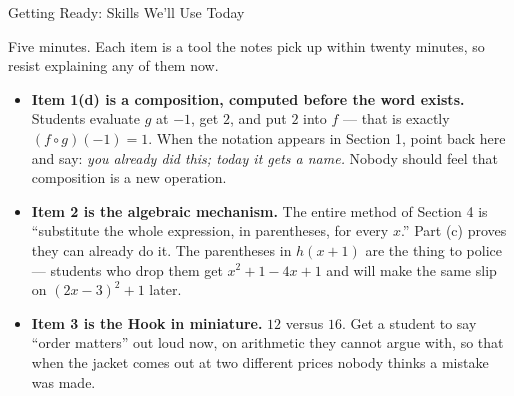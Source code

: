 \documentclass[10pt]{article}
\begin{document}
\begin{notesbox}{Getting Ready: Skills We'll Use Today}
\end{notesbox}

\begin{teachernote}
\small Five minutes. Each item is a tool the notes pick up within twenty minutes, so resist
explaining any of them now.
\begin{itemize}[leftmargin=1.3em, nosep]
  \item \textbf{Item 1(d) is a composition, computed before the word exists.} Students evaluate
        $g$ at $-1$, get $2$, and put $2$ into $f$ --- that is exactly $(f\circ g)(-1)=1$. When the
        notation appears in Section 1, point back here and say: \emph{you already did this; today it
        gets a name.} Nobody should feel that composition is a new operation.
  \item \textbf{Item 2 is the algebraic mechanism.} The entire method of Section 4 is ``substitute
        the whole expression, in parentheses, for every $x$.'' Part (c) proves they can already do
        it. The parentheses in $h(x+1)$ are the thing to police --- students who drop them get
        $x^{2}+1-4x+1$ and will make the same slip on $(2x-3)^{2}+1$ later.
  \item \textbf{Item 3 is the Hook in miniature.} $12$ versus $16$. Get a student to say
        ``order matters'' out loud now, on arithmetic they cannot argue with, so that when the
        jacket comes out at two different prices nobody thinks a mistake was made.
\end{itemize}
\end{teachernote}
\end{document}
